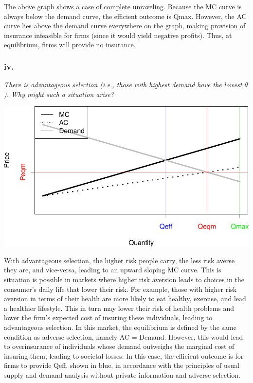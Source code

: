\documentclass[
]{article}
\begin{document}
The above graph shows a case of complete unraveling. Because the MC
curve is always below the demand curve, the efficient outcome is Qmax.
However, the AC curve lies above the demand curve everywhere on the
graph, making provision of insurance infeasible for firms (since it
would yield negative profits). Thus, at equilibrium, firms will provide
no insurance.

\hypertarget{iv.}{%
\subsubsection{iv.}\label{iv.}}

\textit{There is advantageous selection (i.e., those with highest demand have the lowest $\theta$). Why
might such a situation arise?}

\includegraphics{Pset1_files/figure-latex/unnamed-chunk-5-1.pdf}

With advantageous selection, the higher risk people carry, the less risk
averse they are, and vice-versa, leading to an upward sloping MC curve.
This is situation is possible in markets where higher risk aversion
leads to choices in the consumer's daily life that lower their risk. For
example, those with higher risk aversion in terms of their health are
more likely to eat healthy, exercise, and lead a healthier lifestyle.
This in turn may lower their risk of health problems and lower the
firm's expected cost of insuring these individuals, leading to
advantageous selection. In this market, the equilibrium is defined by
the same condition as adverse selection, namely AC = Demand. However,
this would lead to overinsurance of individuals whose demand outweighs
the marginal cost of insuring them, leading to societal losses. In this
case, the efficient outcome is for firms to provide Qeff, shown in blue,
in accordance with the principles of usual supply and demand analysis
without private information and adverse selection.
\end{document}
